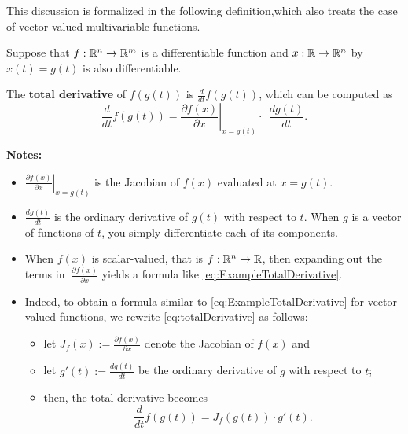 This discussion is formalized in the following definition,which also treats the case of vector valued multivariable functions.


\begin{tcolorbox}[colback=mylightblue, title = {\bf Total Derivative of a Multivariable Function}, breakable]
Suppose that $f:\mathbb R^{n} \to \mathbb R^{m}$ is a differentiable function and $x:\mathbb R \to \mathbb R^{n}$ by $x(t) = g(t)$ is also differentiable. 
\begin{definition}
\label{def:totalDerivative}
The \textbf{total derivative} of $f(g(t))$ is $\frac{d}{dt} f(g(t))$, which can be computed as
 \begin{equation}
\label{eq:totalDerivative}
\frac{d}{dt} f(g(t)) = \left. \frac{\partial f(x)}{\partial x}\right|_{x = g(t)} \cdot ~~\frac{d g(t)}{dt} .
\end{equation}



\bigskip

\textbf{Notes:} 
\begin{itemize}
    \item $ \left. \frac{\partial f(x)}{\partial x}\right|_{x = g(t)}$ is the Jacobian of $f(x)$ evaluated 
    at $x=g(t)$.
    \item $\frac{d g(t)}{dt}$ is the ordinary derivative of $g(t)$ with respect to $t$. When $g$ is a vector of functions of $t$, you simply differentiate each of its components.
    \item When $f(x)$ is scalar-valued, that is $f:\mathbb R^{n} \to \mathbb R$, then expanding out the terms in $\ \frac{\partial f(x)}{\partial x}$ yields a formula like \eqref{eq:ExampleTotalDerivative}.
    \item Indeed, to obtain a formula similar to \eqref{eq:ExampleTotalDerivative} for vector-valued functions, we rewrite \eqref{eq:totalDerivative} as follows:
    \begin{itemize}
        \item let $J_f(x):= \frac{\partial f(x)}{\partial x}$ denote the Jacobian of $f(x)$ and
        \item let $g'(t):=\frac{d g(t)}{dt}$ be the ordinary derivative of $g$ with respect to $t$;
        \item then, the total derivative becomes 
        $$ \frac{d}{dt} f(g(t)) = J_f(g(t)) \cdot g'(t).$$
    \end{itemize}
\end{itemize}

\vspace{.1cm}
\end{definition}
\end{tcolorbox}

